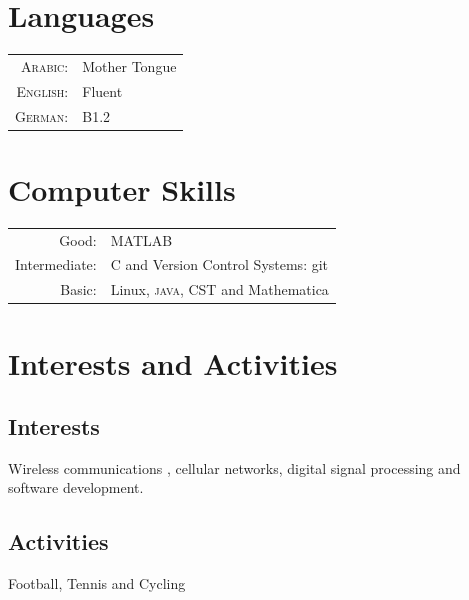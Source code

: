 \documentclass[a4paper,10pt]{article}
\begin{document}
\section{Languages}
\begin{tabular}{rl}
\textsc{Arabic:}&Mother Tongue\\
\textsc{English:}&Fluent\\
\textsc{German:}&B1.2\\
\end{tabular}

\section{Computer Skills}
\begin{tabular}{rl}
Good:& \textsc{MATLAB} \\
Intermediate:& C and Version Control Systems: git \\
Basic:& Linux, \textsc{java}, \textsc{CST} and Mathematica
\end{tabular}

\section{Interests and Activities}
\subsection*{Interests}
Wireless communications , cellular networks, digital signal processing and software development.\\
\subsection*{Activities}
Football, Tennis and Cycling



\end{document}
